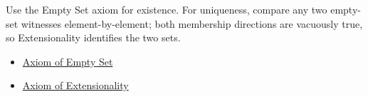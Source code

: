 \begin{remark*}
Use the Empty Set axiom for existence. For uniqueness, compare any two
empty-set witnesses element-by-element; both membership directions are
vacuously true, so Extensionality identifies the two sets.
\end{remark*}

\begin{dependencies}
\begin{itemize}
  \item \hyperref[ax:empty-set]{Axiom of Empty Set}
  \item \hyperref[ax:extensionality]{Axiom of Extensionality}
\end{itemize}
\end{dependencies}

\clearpage
